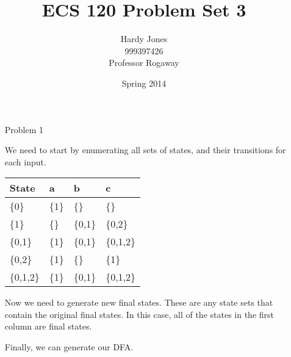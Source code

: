\documentclass[12pt,letterpaper]{article}
\title{ECS 120 Problem Set 3\vspace{-2ex}}
\author{Hardy Jones\\
        999397426\\
        Professor Rogaway\vspace{-2ex}}
\date{Spring 2014}
\begin{document}
  \maketitle

  \begin{enumerate}
    \item[Problem 1]

      We need to start by enumerating all sets of states,
      and their transitions for each input.

      \begin{tabular}{l | l | l | l}
        State & a & b & c \\
        \hline
        \{0\}     & \{1\} & \{\}    & \{\}      \\
        \{1\}     & \{\}  & \{0,1\} & \{0,2\}   \\
        \{0,1\}   & \{1\} & \{0,1\} & \{0,1,2\} \\
        \{0,2\}   & \{1\} & \{\}    & \{1\}     \\
        \{0,1,2\} & \{1\} & \{0,1\} & \{0,1,2\}
      \end{tabular}

      Now we need to generate new final states.
      These are any state sets that contain the original final states.
      In this case, all of the states in the first column are final states.

      Finally, we can generate our DFA.


\end{enumerate}
\end{document}
